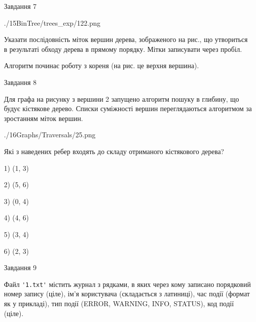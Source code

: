 \documentclass[12pt, ukrainian]{article}
\def\code#1{\Verb!#1!}
\begin{document}
{\vspace{10mm}\par

\newpage
\begin{minipage}[t]{9.7cm}
               
{\begin{center}Завдання {7}\end{center}}
\vspace{-6mm}

\begin{center}
	{./15BinTree/trees_exp/122.png}
\end{center}
Указати послідовність міток вершин дерева, зображеного на рис., що утвориться в результаті обходу дерева в прямому порядку. Мітки записувати через пробіл.\par Алгоритм починає роботу з кореня (на рис. це верхня вершина).\par

\end{minipage}
\vline \hspace{8mm}
\begin{minipage}[t]{8.0cm}
               
{\begin{center}Завдання {8}\end{center}}
\vspace{-6mm}
Для графа на рисунку з вершини 2 запущено алгоритм пошуку в глибину, що будує кістякове дерево. Списки суміжності вершин переглядаються алгоритмом за зростанням міток вершин.\par
\begin{center}
	{./16Graphs/Traversals/25.png}
\end{center}
\par Які з наведених ребер входять до складу отриманого кістякового дерева?\par
1) (1, 3)\par
2) (5, 6)\par
3) (0, 4)\par
4) (4, 6)\par
5) (3, 4)\par
6) (2, 3)\par
{\vskip 15pt} \par

\end{minipage}

               
{\begin{center}Завдання {9}\end{center}}
\vspace{-6mm}
Файл \code{'1.txt'} містить журнал з рядками, в яких через кому записано поряд\-ко\-вий номер запису (ціле), ім'я користувача (складається з латиниці), час події (фор\-мат як у прикладі), тип події (ERROR, WARNING, INFO, STATUS), код події (ціле).

}
\end{document}
